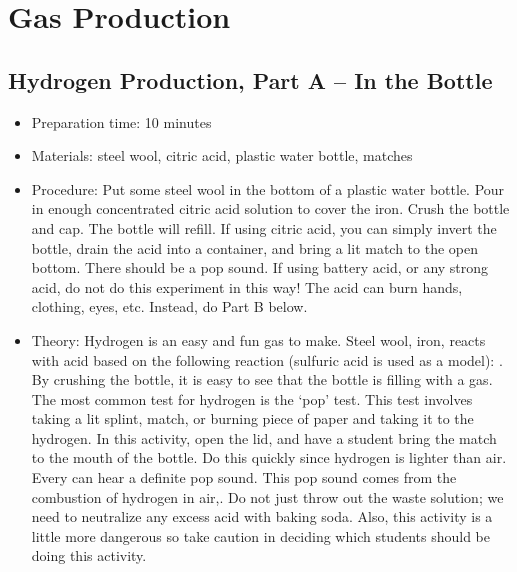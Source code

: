 \section{Gas Production}

\subsection{Hydrogen Production, Part A – In the Bottle}
\begin{itemize}
\item{Preparation time: 10 minutes}
\item{Materials: steel wool, citric acid, plastic water bottle, matches}
\item{Procedure: Put some steel wool in the bottom of a plastic water bottle. Pour in enough concentrated citric acid solution to cover the iron. Crush the bottle and cap. The bottle will refill. If using citric acid, you can simply invert the bottle, drain the acid into a container, and bring a lit match to the open bottom. There should be a pop sound. If using battery acid, or any strong acid, do not do this experiment in this way! The acid can burn hands, clothing, eyes, etc. Instead, do Part B below.}
\item{Theory: Hydrogen is an easy and fun gas to make. Steel wool, iron, reacts with acid based on the following reaction (sulfuric acid is used as a model): . By crushing the bottle, it is easy to see that the bottle is filling with a gas. The most common test for hydrogen is the ‘pop’ test. This test involves taking a lit splint, match, or burning piece of paper and taking it to the hydrogen. In this activity, open the lid, and have a student bring the match to the mouth of the bottle. Do this quickly since hydrogen is lighter than air. Every can hear a definite pop sound. This pop sound comes from the combustion of hydrogen in air,. Do not just throw out the waste solution; we need to neutralize any excess acid with baking soda. Also, this activity is a little more dangerous so take caution in deciding which students should be doing this activity.}
\end{itemize}

